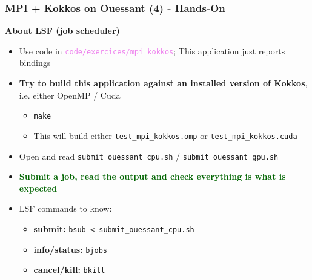 \begin{frame}[fragile=singleslide]
  \frametitle{MPI + Kokkos on Ouessant (4) - Hands-On}

  {\Large \bf About LSF (job scheduler)}
  
  \begin{itemize}
  \item Use code in \textcolor{violet}{\texttt{code/exercices/mpi\_kokkos}}; This application just reports bindings
  \item {\bf Try to build this application against an installed version of Kokkos}, i.e. either OpenMP / Cuda
    \begin{itemize}
    \item \texttt{make}
    \item This will build either \texttt{test\_mpi\_kokkos.omp} or \texttt{test\_mpi\_kokkos.cuda}
    \end{itemize}
  \item Open and read \texttt{submit\_ouessant\_cpu.sh} / \texttt{submit\_ouessant\_gpu.sh}
  \item {\bf \textcolor{darkgreen}{Submit a job, read the output and check everything is what is expected}}
  \item LSF commands to know:
    \begin{itemize}
    \item {\bf submit:} \texttt{bsub < submit\_ouessant\_cpu.sh}
    \item {\bf info/status:} \texttt{bjobs}
    \item {\bf cancel/kill:} \texttt{bkill}
    \end{itemize}
  \end{itemize}

\end{frame}
